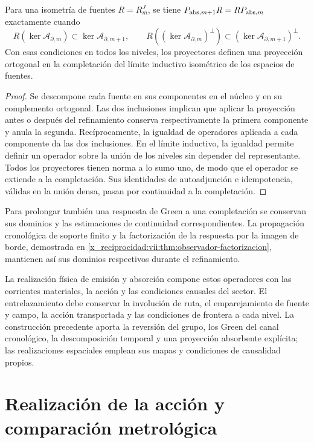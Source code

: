 \begin{proposition}
\label{x_reciprocidad:vii:prop:naturalidad-proyeccion-absorcion}
Para una isometría de fuentes \(R=R_m^J\), se tiene
\(P_{{\rm abs},m+1}R=RP_{{\rm abs},m}\) exactamente cuando
\[
 R(\ker\mathcal A_{\partial,m})
       \subset\ker\mathcal A_{\partial,m+1},\qquad
 R((\ker\mathcal A_{\partial,m})^\perp)
       \subset(\ker\mathcal A_{\partial,m+1})^\perp.
\]
Con esas condiciones en todos los niveles, los proyectores definen una
proyección ortogonal en la completación del límite inductivo isométrico
de los espacios de fuentes.
\end{proposition}
\begin{proof}
Se descompone cada fuente en sus componentes en el núcleo y en su
complemento ortogonal. Las dos inclusiones implican que aplicar la
proyección antes o después del refinamiento conserva respectivamente la
primera componente y anula la segunda. Recíprocamente, la igualdad de
operadores aplicada a cada componente da las dos inclusiones.
En el límite inductivo, la igualdad permite definir un operador sobre la
unión de los niveles sin depender del representante. Todos los proyectores
tienen norma a lo sumo uno, de modo que el operador se extiende a la
completación. Sus identidades de autoadjunción e idempotencia, válidas en
la unión densa, pasan por continuidad a la completación.
\end{proof}

Para prolongar también una respuesta de Green a una completación se
conservan sus dominios y las estimaciones de continuidad correspondientes.
La propagación cronológica de soporte finito y la factorización de la
respuesta por la imagen de borde, demostrada en
\ref{x_reciprocidad:vii:thm:observador-factorizacion}, mantienen así sus dominios
respectivos durante el refinamiento.

La realización física de emisión y absorción compone estos operadores con
las corrientes materiales, la acción y las condiciones causales del sector.
El entrelazamiento debe conservar la involución de ruta, el emparejamiento
de fuente y campo, la acción transportada y las condiciones de frontera a
cada nivel. La construcción precedente aporta la reversión del grupo, los
Green del canal cronológico, la descomposición temporal y una proyección
absorbente explícita; las realizaciones espaciales emplean sus mapas y
condiciones de causalidad propios.


\chapter{Realización de la acción y comparación metrológica}

